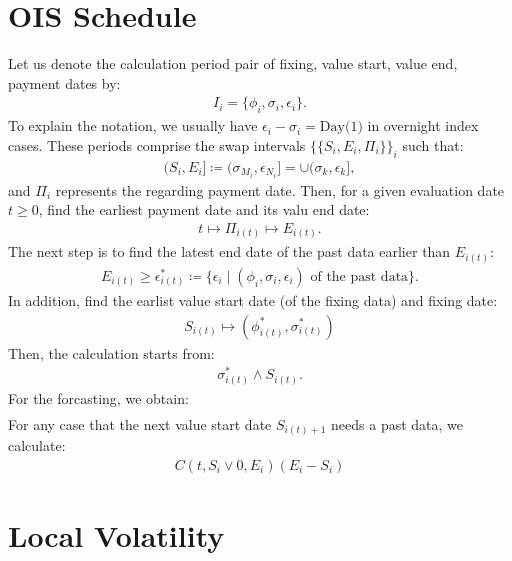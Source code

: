 \documentclass[a4paper, 11pt]{article}              %
\numberwithin{equation}{section}
\theoremstyle{plain}
\newcommand{\1}{\mathds{1}}
\theoremstyle{plain}
\theoremstyle{definition}
\theoremstyle{plain}
\begin{document}
\section{OIS Schedule}
\label{sec:ois}
Let us denote the calculation period pair of fixing, value start,
value end, payment dates by:
\begin{align}
  I_i = \{\phi_i, \sigma_i, \epsilon_i\}.
\end{align}
To explain the notation, we usually have $\epsilon_i - \sigma_i = \text{Day(1)}$
in overnight index cases. These periods comprise the swap intervals
$\{\{S_i, E_i, \Pi_i\}\}_i$ such that:
\begin{align}
  (S_i, E_i] \coloneqq (\sigma_{M_i}, \epsilon_{N_i}] = \cup(\sigma_k, \epsilon_k],
\end{align}
and $\Pi_i$ represents the regarding payment date. 
Then, for a given evaluation date $t \geq 0$, find the earliest payment date and
its valu end date:
\begin{align}
  t \mapsto \Pi_{i(t)} \mapsto E_{i(t)}.
\end{align}
The next step is to find the latest end date of the past data earlier than
$E_{i(t)}$:
\begin{align}
  E_{i(t)} \geq \epsilon^*_{i(t)}
  \coloneqq \{\epsilon_i \mid (\phi_i, \sigma_i, \epsilon_i) \text{ of the past data}\}.
\end{align}
In addition, find the earlist value start date (of the fixing data) and fixing
date:
\begin{align}
  S_{i(t)} \mapsto (\phi^*_{i(t)}, \sigma_{i(t)}^*)
\end{align}
Then, the calculation starts from:
\begin{align}
  \sigma_{i(t)}^* \wedge S_{i(t)}.
\end{align}
For the forcasting, we obtain:
\begin{align}
  [1+C(0, 0, E_{i(t)}) (E_{i(t)} -\epsilon^*_{i(t)})]
\end{align}
For any case that the next value start date $S_{i(t)+1}$ needs a past data, we
calculate:
\begin{align}
  C(t, S_i \vee 0, E_i) (E_{i} -S_{i})
\end{align}

\section{Local Volatility}
\end{document}
